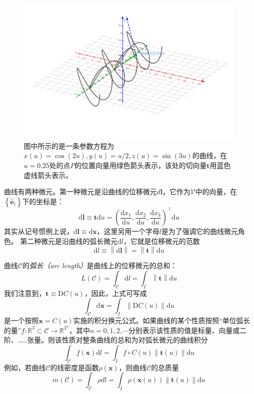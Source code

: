 \documentclass[../main.tex]{subfiles}
\begin{document}
\begin{figure}[ht]
    \centering
    \includegraphics[width=\textwidth]{images/Tangent Vector.png}
    \caption{图中所示的是一条参数方程为$x\left(u\right)=\cos\left(2 u\right),y\left(u\right)=u/2,z\left(u\right)=\sin\left(3 u\right)$的曲线，在$u=0.25$处的点$P$的位置向量用绿色箭头表示，该处的切向量$\mathbf{t}$用蓝色虚线箭头表示。}
    \label{fig:II.5.3}
\end{figure}

曲线有两种微元。第一种微元是沿曲线的位移微元$d\mathbf{l}$，它作为$\mathcal{V}$中的向量，在$\left\{\mathbf{\hat{e}}_i\right\}$下的坐标是：
\[\mathrm{d}\mathbf{l}\equiv\mathbf{t}\mathrm{d}u=\left(\frac{\mathrm{d}x_1}{\mathrm{d}u},\frac{\mathrm{d}x_2}{\mathrm{d}u},\frac{\mathrm{d}x_3}{\mathrm{d}u}\right)^\intercal \mathrm{d}u\]
其实从记号惯例上说，$\mathrm{d}\mathbf{l}\equiv\mathrm{d}\mathbf{x}$，这里另用一个字母$l$是为了强调它的曲线微元角色。
第二种微元是沿曲线的弧长微元$\mathrm{d}l$，它就是位移微元的范数
\[\mathrm{d}l\equiv\left\|\mathrm{d}\mathbf{l}\right\|=\left\|\mathbf{t}\right\|\mathrm{d}u\]

曲线$\mathcal{C}$的\emph{弧长（arc length）}是曲线上的位移微元的总和：
\[L\left(\mathcal{C}\right)=\int_{\mathcal{C}}\mathrm{d}l=\int_I\left\|\mathbf{t}\right\|\mathrm{d}u\]
我们注意到，$\mathbf{t}\equiv \mathrm{D}C\left(u\right)$，因此，上式可写成
\[\int_\mathcal{C}\mathrm{d}\mathbf{x}=\int_I \left\|\mathrm{D}C\left(u\right)\right\|\mathrm{d}u\]
是一个按照$\mathbf{x}=C\left(u\right)$实施的积分换元公式。如果曲线的某个性质按照“单位弧长的量”$f:\mathbb{R}^3\subset\mathcal{C}\rightarrow\mathbb{R}^{3^n}$，其中$n=0,1,2,\cdots$分别表示该性质的值是标量、向量或二阶、……张量。则该性质对整条曲线的总和为对弧长微元的曲线积分\cite[\S 9.1]{华工高数2009下}
\[\int_\mathcal{C}f\left(\mathbf{x}\right)\mathrm{d}l=\int_I f\circ C\left(u\right)\left\|\mathbf{t}\left(u\right)\right\|\mathrm{d}u\]
例如，若曲线$\mathcal{C}$的线密度是函数$\rho\left(\mathbf{x}\right)$，则曲线$\mathcal{C}$的总质量
\[
    m\left(\mathcal{C}\right)=\int_\mathcal{C}\rho dl=\int_I\rho\left(\mathbf{x}\left(u\right)\right)\left\|\mathbf{t}\left(u\right)\right\|\mathrm{d}u
\]
\end{document}
